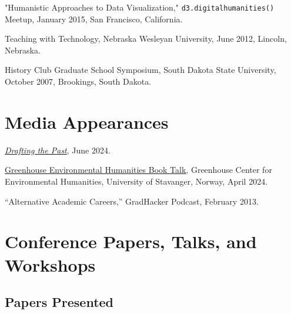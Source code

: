 \documentclass[10pt]{article}
\begin{document}
"Humanistic Approaches to Data Visualization," \texttt{d3.digitalhumanities()} Meetup, January 2015, San Francisco, California.

Teaching with Technology, Nebraska Wesleyan University, June 2012, Lincoln, Nebraska.

History Club Graduate School Symposium, South Dakota State University, October 2007, Brookings, South Dakota.

\section{Media Appearances}

\href{https://draftingthepast.com/podcast-episodes/episode-45-jason-heppler-wants-tools-that-fit-his-questions/}{\textit{Drafting the Past}}, June 2024.

\href{https://vimeo.com/947498919}{Greenhouse Environmental Humanities Book Talk}, Greenhouse Center for Environmental Humanities, University of Stavanger, Norway, April 2024.

``Alternative Academic Careers,'' GradHacker Podcast, February 2013.

\section*{Conference Papers, Talks, and Workshops}

\subsection*{Papers Presented}
\end{document}
